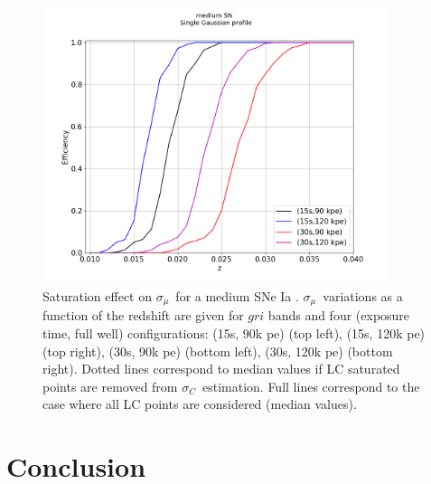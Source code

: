 \documentclass[\docopts]{\docclass}
\newcommand{\sne}{{SNe Ia }}
\newcommand{\pe}{{pe}}
\newcommand{\colorerr}{{$\sigma_C$}}
\newcommand{\sigmu}{{$\sigma_\mu$}}
\begin{document}
\begin{figure}[htbp]
\begin{center}
  \includegraphics[width=0.9\textwidth]{Effi_medium.png}
 \caption{Saturation effect on \sigmu~for a medium \sne. \sigmu~variations as a function of the redshift are given for $gri$ bands and four (exposure time, full well) configurations: (15s, 90k \pe) (top left),  (15s, 120k \pe) (top right), (30s, 90k \pe) (bottom left),  (30s, 120k \pe) (bottom right). Dotted lines correspond to median values if LC saturated points are removed from \colorerr~estimation. Full lines correspond to the case where all LC points are considered (median values).}\label{fig:effimedium}
\end{center}
\end{figure}



\section{Conclusion}
\label{sec:conclusion}
\end{document}

